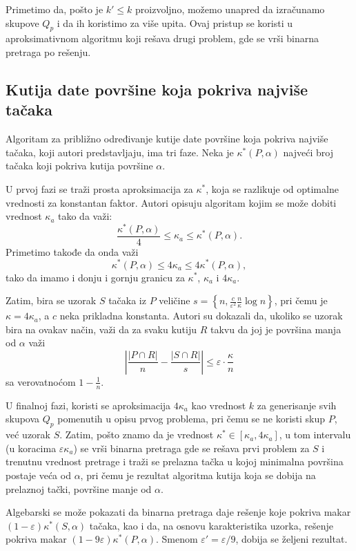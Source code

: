 \documentclass[a4paper]{article}
\begin{document}
Primetimo da, pošto je $k' \leqslant k$ proizvoljno, možemo unapred da izračunamo skupove $Q_p$ i da ih koristimo za više upita. Ovaj pristup se koristi u aproksimativnom algoritmu koji rešava drugi problem, gde se vrši binarna pretraga po rešenju.

\subsection{Kutija date površine koja pokriva najviše tačaka}

Algoritam za približno određivanje kutije date površine koja pokriva najviše tačaka, koji autori predstavljaju, ima tri faze. Neka je $\kappa^\ast (P, \alpha)$ najveći broj tačaka koji pokriva kutija površine $\alpha$.

U prvoj fazi se traži prosta aproksimacija za $\kappa^\ast$, koja se razlikuje od optimalne vrednosti za konstantan faktor. Autori opisuju algoritam kojim se može dobiti vrednost $\kappa_a$ tako da važi:
\[ \frac{\kappa^\ast (P, \alpha)}{4} \leqslant \kappa_a \leqslant \kappa^\ast (P, \alpha). \] Primetimo takođe da onda važi
\[ \kappa^\ast (P, \alpha) \leqslant 4 \kappa_a \leqslant 4 \kappa^\ast (P, \alpha) ,\] tako da imamo i donju i gornju granicu za $\kappa^\ast$, $\kappa_a$ i $4 \kappa_a$.

Zatim, bira se uzorak $S$ tačaka iz $P$ veličine $s = \left\{ n, \frac{c}{\varepsilon^2}\frac{n}{\kappa} \log n \right\}$, pri čemu je $\kappa = 4 \kappa_a$, a $c$ neka prikladna konstanta. Autori su dokazali da, ukoliko se uzorak bira na ovakav način, važi da za svaku kutiju $R$ takvu da joj je površina manja od $\alpha$ važi \[\left|\frac{\left|P \cap R\right|}{n} - \frac{\left|S \cap R\right|}{s}\right| \leqslant \varepsilon \cdot \frac{\kappa}{n}\]
sa verovatnoćom $1 - \frac{1}{n}$.

U finalnoj fazi, koristi se aproksimacija $4 \kappa_a$ kao vrednost $k$ za generisanje svih skupova $Q_p$ pomenutih u opisu prvog problema, pri čemu se ne koristi skup $P$, već uzorak $S$. Zatim, pošto znamo da je vrednost $\kappa^\ast \in \left[ \kappa_a, 4 \kappa_a \right]$, u tom intervalu (u koracima $\varepsilon \kappa_a$) se vrši binarna pretraga gde se rešava prvi problem za $S$ i trenutnu vrednost pretrage i traži se prelazna tačka u kojoj minimalna površina postaje veća od $\alpha$, pri čemu je rezultat algoritma kutija koja se dobija na prelaznoj tački, površine manje od $\alpha$.

Algebarski se može pokazati da binarna pretraga daje rešenje koje pokriva makar $(1 - \varepsilon) \kappa^\ast (S, \alpha)$ tačaka, kao i da, na osnovu karakteristika uzorka, rešenje pokriva makar $(1 - 9 \varepsilon) \kappa^\ast (P, \alpha)$. Smenom $\varepsilon' = \varepsilon / 9$, dobija se željeni rezultat.
\end{document}
